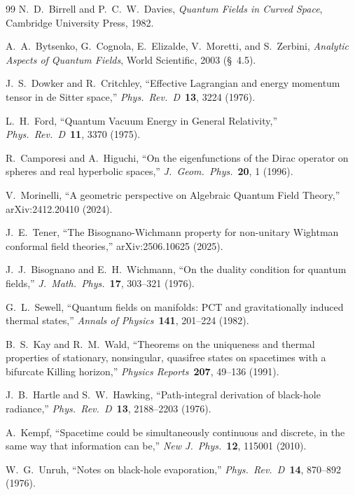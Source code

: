 \documentclass[11pt]{article}
\begin{document}
\begin{thebibliography}{99}
N.~D.~Birrell and P.~C.~W.~Davies,
\textit{Quantum Fields in Curved Space},
Cambridge University Press, 1982.

A.~A.~Bytsenko, G.~Cognola, E.~Elizalde, V.~Moretti, and S.~Zerbini,
\textit{Analytic Aspects of Quantum Fields},
World Scientific, 2003 (\S~4.5).

J.~S.~Dowker and R.~Critchley, ``Effective Lagrangian and energy
momentum tensor in de Sitter space,''
\textit{Phys.\ Rev.\ D}\ \textbf{13}, 3224 (1976).

L.~H.~Ford, ``Quantum Vacuum Energy in General Relativity,''
\textit{Phys.\ Rev.\ D}\ \textbf{11}, 3370 (1975).

R.~Camporesi and A.~Higuchi, ``On the eigenfunctions of the Dirac
operator on spheres and real hyperbolic spaces,''
\textit{J.\ Geom.\ Phys.}\ \textbf{20}, 1 (1996).

V.~Morinelli,
``A geometric perspective on Algebraic Quantum Field Theory,''
arXiv:2412.20410 (2024).

J.~E.~Tener,
``The Bisognano-Wichmann property for non-unitary Wightman conformal
field theories,''
arXiv:2506.10625 (2025).

J.~J.~Bisognano and E.~H.~Wichmann,
``On the duality condition for quantum fields,''
\textit{J.\ Math.\ Phys.}\ \textbf{17}, 303--321 (1976).

G.~L.~Sewell,
``Quantum fields on manifolds: PCT and gravitationally induced thermal
states,''
\textit{Annals of Physics}\ \textbf{141}, 201--224 (1982).

B.~S.~Kay and R.~M.~Wald, ``Theorems on the uniqueness and thermal
properties of stationary, nonsingular, quasifree states on spacetimes
with a bifurcate Killing horizon,'' \textit{Physics Reports}\
\textbf{207}, 49--136 (1991).

J.~B.~Hartle and S.~W.~Hawking,
``Path-integral derivation of black-hole radiance,''
\textit{Phys.\ Rev.\ D}\ \textbf{13}, 2188--2203 (1976).

A.~Kempf, ``Spacetime could be simultaneously continuous and discrete,
in the same way that information can be,''
\textit{New J.\ Phys.}~\textbf{12}, 115001 (2010).

W.~G.~Unruh,
``Notes on black-hole evaporation,''
\textit{Phys.\ Rev.\ D}\ \textbf{14}, 870--892 (1976).

\end{thebibliography}
\end{document}
